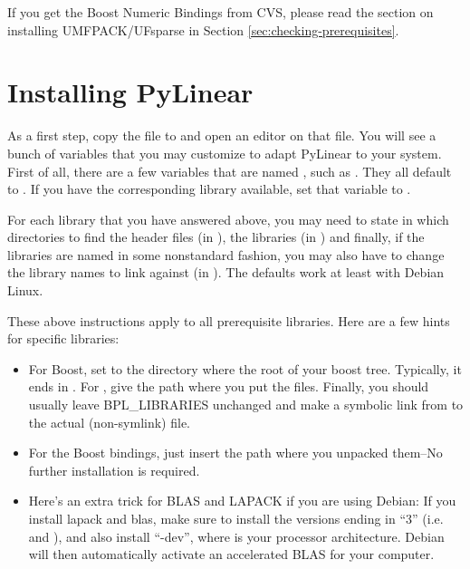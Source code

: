 If you get the Boost Numeric Bindings from CVS, please read the section
on installing UMFPACK/UFsparse in Section \ref{sec:checking-prerequisites}.

\section{Installing PyLinear}

As a first step, copy the file  to
 and open an editor on that file. You will
see a bunch of variables that you may customize to adapt
PyLinear to your system. First of all, there are a few variables
that are named , such as . They
all default to . If you have the corresponding library
available, set that variable to .

For each library that you have answered  above, you may
need to state in which directories to find the header files (in
), the libraries (in )
and finally, if the libraries are named in some nonstandard fashion,
you may also have to change the library names to link against (in
). The defaults work at least with Debian Linux. 

These above instructions apply to all prerequisite libraries. Here are
a few hints for specific libraries:
\begin{itemize}
\item For Boost, set  to the directory where
  the root of your boost tree.  Typically, it ends in
  . For , give the path where you
  put the  files. Finally, you should
  usually leave BPL_LIBRARIES unchanged and make a symbolic link from
   to the actual (non-symlink) 
  file.
\item For the Boost bindings, just insert the path where you unpacked
  them--No further installation is required.
\item Here's an extra trick for BLAS and LAPACK if you are using
  Debian: If you install lapack and blas, make sure to install the
  versions ending in ``3'' (i.e.  and
  ), and also install ``-dev'',
  where  is your processor architecture. Debian will then
  automatically activate an accelerated BLAS for your computer.
\end{itemize}

